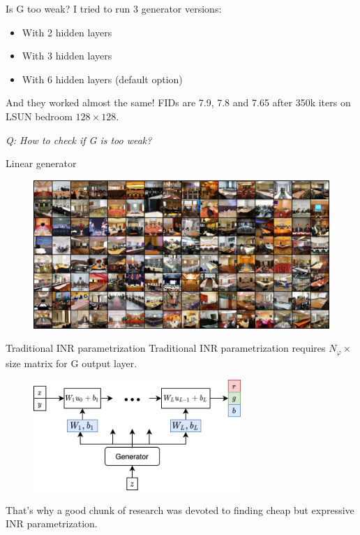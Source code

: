 \documentclass[10pt]{beamer}
\begin{document}
\begin{frame}{Is G too weak?}
I tried to run 3 generator versions:
\begin{itemize}
    \item With 2 hidden layers
    \item With 3 hidden layers
    \item With 6 hidden layers (default option)
\end{itemize}

And they worked almost the same!
FIDs are 7.9, 7.8 and 7.65 after 350k iters on LSUN bedroom $128 \times 128$.

\textit{Q: How to check if G is too weak?}
\end{frame}


\begin{frame}{Linear generator}
\begin{figure}
\centering
\includegraphics[width=\textwidth]{images/linear-generator}
\end{figure}
\end{frame}


\begin{frame}{Traditional INR parametrization}
\pause
Traditional INR parametrization requires $N_\varphi \times $ size matrix for G output layer.
\begin{figure}
\centering
\includegraphics[width=0.7\textwidth]{images/linear-inr}
\end{figure}

\pause
That's why a good chunk of research was devoted to finding cheap but expressive INR parametrization.
\end{frame}
\end{document}
